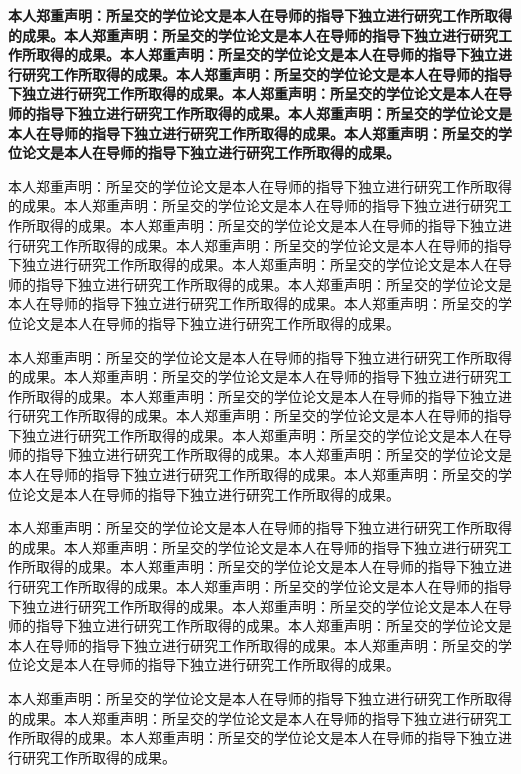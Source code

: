 \documentclass[class = professional, twoside, AutoFakeBold=3.17,AutoFakeSlant=0.2]{gdufe_master_thesis}
\begin{document}
{\bfseries 本人郑重声明：所呈交的学位论文是本人在导师的指导下独立进行研究工作所取得的成果。本人郑重声明：所呈交的学位论文是本人在导师的指导下独立进行研究工作所取得的成果。本人郑重声明：所呈交的学位论文是本人在导师的指导下独立进行研究工作所取得的成果。本人郑重声明：所呈交的学位论文是本人在导师的指导下独立进行研究工作所取得的成果。本人郑重声明：所呈交的学位论文是本人在导师的指导下独立进行研究工作所取得的成果。本人郑重声明：所呈交的学位论文是本人在导师的指导下独立进行研究工作所取得的成果。本人郑重声明：所呈交的学位论文是本人在导师的指导下独立进行研究工作所取得的成果。
    \the\baselineskip}

{ \setlength{\baselineskip}{20pt}本人郑重声明：所呈交的学位论文是本人在导师的指导下独立进行研究工作所取得的成果。本人郑重声明：所呈交的学位论文是本人在导师的指导下独立进行研究工作所取得的成果。本人郑重声明：所呈交的学位论文是本人在导师的指导下独立进行研究工作所取得的成果。本人郑重声明：所呈交的学位论文是本人在导师的指导下独立进行研究工作所取得的成果。本人郑重声明：所呈交的学位论文是本人在导师的指导下独立进行研究工作所取得的成果。本人郑重声明：所呈交的学位论文是本人在导师的指导下独立进行研究工作所取得的成果。本人郑重声明：所呈交的学位论文是本人在导师的指导下独立进行研究工作所取得的成果。
    \the\baselineskip}

本人郑重声明：所呈交的学位论文是本人在导师的指导下独立进行研究工作所取得的成果。本人郑重声明：所呈交的学位论文是本人在导师的指导下独立进行研究工作所取得的成果。本人郑重声明：所呈交的学位论文是本人在导师的指导下独立进行研究工作所取得的成果。本人郑重声明：所呈交的学位论文是本人在导师的指导下独立进行研究工作所取得的成果。本人郑重声明：所呈交的学位论文是本人在导师的指导下独立进行研究工作所取得的成果。本人郑重声明：所呈交的学位论文是本人在导师的指导下独立进行研究工作所取得的成果。本人郑重声明：所呈交的学位论文是本人在导师的指导下独立进行研究工作所取得的成果。
\the\baselineskip

本人郑重声明：所呈交的学位论文是本人在导师的指导下独立进行研究工作所取得的成果。本人郑重声明：所呈交的学位论文是本人在导师的指导下独立进行研究工作所取得的成果。本人郑重声明：所呈交的学位论文是本人在导师的指导下独立进行研究工作所取得的成果。本人郑重声明：所呈交的学位论文是本人在导师的指导下独立进行研究工作所取得的成果。本人郑重声明：所呈交的学位论文是本人在导师的指导下独立进行研究工作所取得的成果。本人郑重声明：所呈交的学位论文是本人在导师的指导下独立进行研究工作所取得的成果。本人郑重声明：所呈交的学位论文是本人在导师的指导下独立进行研究工作所取得的成果。

本人郑重声明：所呈交的学位论文是本人在导师的指导下独立进行研究工作所取得的成果。本人郑重声明：所呈交的学位论文是本人在导师的指导下独立进行研究工作所取得的成果。本人郑重声明：所呈交的学位论文是本人在导师的指导下独立进行研究工作所取得的成果。
\end{document}
